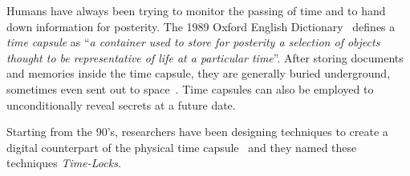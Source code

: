 Humans have always been trying to monitor the passing of time and to hand down
information for posterity.  The 1989 Oxford English
Dictionary~\cite{dictionary1989oxford} defines a {\em time capsule} as ``{\em a
container used to store for posterity a selection of objects thought to be
representative of life at a particular time}''.  After storing documents and
memories inside the time capsule, they are generally buried underground,
sometimes even sent out to space~\cite{jarvis2015time}.  Time capsules can also
be employed to unconditionally reveal secrets at a future date.

Starting from the 90's, researchers have been designing techniques to create a
digital counterpart of the physical time capsule~\cite{may1993timed} and they
named these techniques {\em Time-Locks}.
